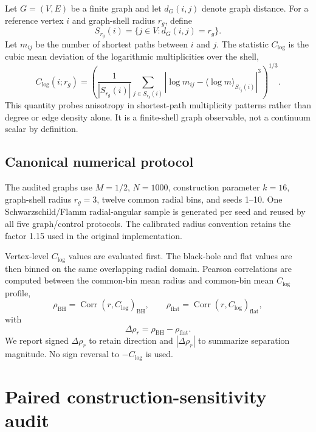 \documentclass[11pt]{article}
\newcommand{\clog}{C_{\log}}
\newcommand{\drho}{\Delta\rho_r}
\begin{document}
Let $G=(V,E)$ be a finite graph and let $d_G(i,j)$ denote graph distance. For a
reference vertex $i$ and graph-shell radius $r_g$, define
\begin{equation}
    S_{r_g}(i) = \{j \in V : d_G(i,j)=r_g\}.
\end{equation}
Let $m_{ij}$ be the number of shortest paths between $i$ and $j$. The statistic
$\clog$ is the cubic mean deviation of the logarithmic multiplicities over the
shell,
\begin{equation}
    \clog(i;r_g)
    =
    \left(
    \frac{1}{|S_{r_g}(i)|}
    \sum_{j\in S_{r_g}(i)}
    \left|
    \log m_{ij} - \langle \log m \rangle_{S_{r_g}(i)}
    \right|^3
    \right)^{1/3}.
    \label{eq:clog}
\end{equation}
This quantity probes anisotropy in shortest-path multiplicity patterns rather
than degree or edge density alone. It is a finite-shell graph observable, not a
continuum scalar by definition.

\subsection{Canonical numerical protocol}
\label{sec:numerical-protocol}

The audited graphs use $M=1/2$, $N=1000$, construction parameter $k=16$,
graph-shell radius $r_g=3$, twelve common radial bins, and seeds 1--10. One
Schwarzschild/Flamm radial-angular sample is generated per seed and reused by all
five graph/control protocols. The calibrated radius convention retains the
factor 1.15 used in the original implementation.

Vertex-level $\clog$ values are evaluated first. The black-hole and flat values
are then binned on the same overlapping radial domain. Pearson correlations are
computed between the common-bin mean radius and common-bin mean $\clog$ profile,
\begin{equation}
    \rho_{\mathrm{BH}}
    =\operatorname{Corr}\!\left(r,\clog\right)_{\mathrm{BH}},
    \qquad
    \rho_{\mathrm{flat}}
    =\operatorname{Corr}\!\left(r,\clog\right)_{\mathrm{flat}},
\end{equation}
with
\begin{equation}
    \drho = \rho_{\mathrm{BH}}-\rho_{\mathrm{flat}}.
    \label{eq:delta-rho}
\end{equation}
We report signed $\drho$ to retain direction and $|\drho|$ to summarize
separation magnitude. No sign reversal to $-\clog$ is used.

\section{Paired construction-sensitivity audit}
\label{sec:construction-audit}
\end{document}
